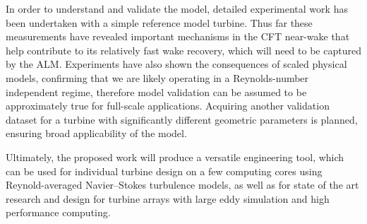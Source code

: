 In order to understand and validate the model, detailed experimental work has
been undertaken with a simple reference model turbine. Thus far these
measurements have revealed important mechanisms in the CFT near-wake that help
contribute to its relatively fast wake recovery, which will need to be captured
by the ALM. Experiments have also shown the consequences of scaled physical
models, confirming that we are likely operating in a Reynolds-number independent
regime, therefore model validation can be assumed to be approximately true for
full-scale applications. Acquiring another validation dataset for a turbine
with significantly different geometric parameters is planned, ensuring broad
applicability of the model.

Ultimately, the proposed work will produce a versatile engineering tool, which
can be used for individual turbine design on a few computing cores using
Reynold-averaged Navier--Stokes turbulence models, as well as for state of the
art research and design for turbine arrays with large eddy simulation and high
performance computing.